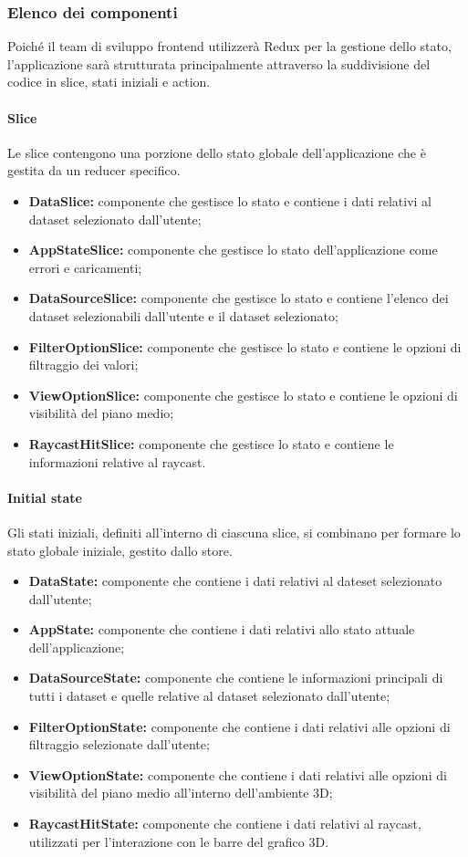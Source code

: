 \subsubsection{Elenco dei componenti}
Poiché il team di sviluppo frontend utilizzerà Redux per la gestione dello
stato, l'applicazione sarà strutturata principalmente attraverso la
suddivisione del codice in slice, stati iniziali e action.
\paragraph{Slice}
Le slice contengono una porzione dello stato globale dell'applicazione che è
gestita da un reducer specifico.
\begin{itemize}
    \item \textbf{DataSlice:} componente che gestisce lo stato e contiene i dati relativi al dataset selezionato dall'utente;
    \item \textbf{AppStateSlice:} componente che gestisce lo stato dell'applicazione come errori e caricamenti;
    \item \textbf{DataSourceSlice:} componente che gestisce lo stato e contiene l'elenco dei dataset selezionabili dall'utente e il dataset selezionato;
    \item \textbf{FilterOptionSlice:} componente che gestisce lo stato e contiene le opzioni di filtraggio dei valori;
    \item \textbf{ViewOptionSlice:} componente che gestisce lo stato e contiene le opzioni di visibilità del piano medio;
    \item \textbf{RaycastHitSlice:} componente che gestisce lo stato e contiene le informazioni relative al raycast.
\end{itemize}
\paragraph{Initial state}
Gli stati iniziali, definiti all'interno di ciascuna slice, si combinano per
formare lo stato globale iniziale, gestito dallo store.
\begin{itemize}
    \item \textbf{DataState:} componente che contiene i dati relativi al dateset selezionato dall'utente;
    \item \textbf{AppState:} componente che contiene i dati relativi allo stato attuale dell'applicazione;
    \item \textbf{DataSourceState:} componente che contiene le informazioni principali di tutti i dataset e quelle relative al dataset selezionato dall'utente;
    \item \textbf{FilterOptionState:} componente che contiene i dati relativi alle opzioni di filtraggio selezionate dall'utente;
    \item \textbf{ViewOptionState:} componente che contiene i dati relativi alle opzioni di visibilità del piano medio all'interno dell'ambiente 3D;
    \item \textbf{RaycastHitState:} componente che contiene i dati relativi al raycast, utilizzati per l'interazione con le barre del grafico 3D.
\end{itemize}
